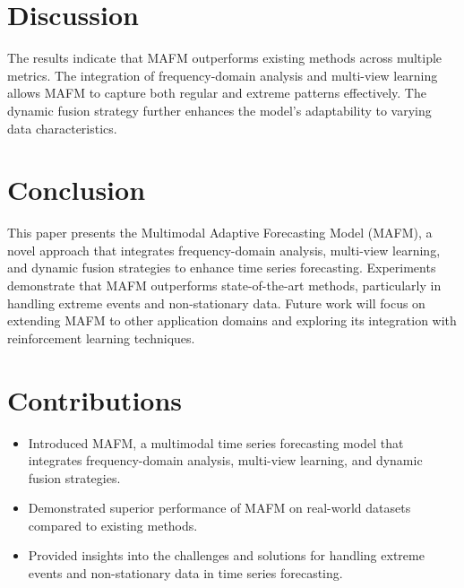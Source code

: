 \documentclass{article}
\begin{document}
\section{Discussion}
The results indicate that MAFM outperforms existing methods across multiple metrics. The integration of frequency-domain analysis and multi-view learning allows MAFM to capture both regular and extreme patterns effectively. The dynamic fusion strategy further enhances the model's adaptability to varying data characteristics.

\section{Conclusion}
This paper presents the Multimodal Adaptive Forecasting Model (MAFM), a novel approach that integrates frequency-domain analysis, multi-view learning, and dynamic fusion strategies to enhance time series forecasting. Experiments demonstrate that MAFM outperforms state-of-the-art methods, particularly in handling extreme events and non-stationary data. Future work will focus on extending MAFM to other application domains and exploring its integration with reinforcement learning techniques.

\section{Contributions}
\begin{itemize}
    \item Introduced MAFM, a multimodal time series forecasting model that integrates frequency-domain analysis, multi-view learning, and dynamic fusion strategies.
    \item Demonstrated superior performance of MAFM on real-world datasets compared to existing methods.
    \item Provided insights into the challenges and solutions for handling extreme events and non-stationary data in time series forecasting.
\end{itemize}
\end{document}
